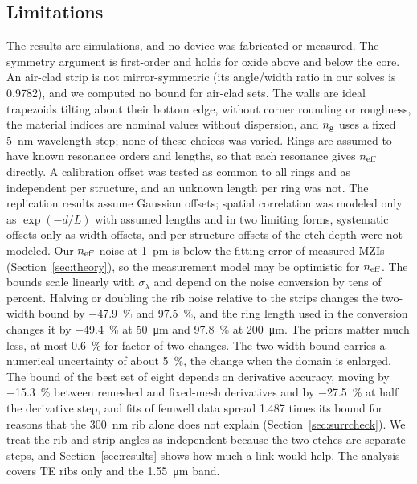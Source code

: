 \subsection{Limitations}

The results are simulations, and no device was fabricated or measured. The symmetry argument is first-order and holds
for oxide above and below the core. An air-clad strip is not mirror-symmetric (its angle/width ratio in our solves is
0.9782), and we computed no bound for air-clad sets. The walls are ideal trapezoids tilting about their bottom edge,
without corner rounding or roughness, the material indices are nominal values without dispersion, and $n_\mathrm{g}$ uses a fixed
\qty{5}{nm} wavelength step; none of these choices was varied. Rings are assumed to have known resonance orders and
lengths, so that each resonance gives $n_\mathrm{eff}$ directly. A calibration offset was tested as common to all rings and as independent per structure, and an unknown
length per ring was not. The replication results assume Gaussian offsets; spatial correlation was modeled only as $\exp(-d/L)$ with assumed lengths and in two limiting
forms, systematic offsets only as width offsets, and per-structure offsets of the etch depth were not modeled. Our $n_\mathrm{eff}$ noise at \qty{1}{pm} is below the fitting error of measured MZIs
(Section~\ref{sec:theory}), so the measurement model may be optimistic for $n_\mathrm{eff}$. The bounds scale linearly with
$\sigma_\lambda$ and depend on the noise conversion by tens of
percent. Halving or doubling the rib noise relative to the strips changes the two-width bound by
\qty{-47.9}{\percent} and \qty{97.5}{\percent}, and the ring length used in the conversion changes it by
\qty{-49.4}{\percent} at \qty{50}{\micro m} and \qty{97.8}{\percent} at \qty{200}{\micro m}. The priors matter much
less, at most \qty{0.6}{\percent} for factor-of-two changes. The two-width bound carries a numerical uncertainty of
about \qty{5}{\percent}, the change when the domain is enlarged. The bound of the best set of eight depends on derivative accuracy,
moving by \qty{-15.3}{\percent} between remeshed and fixed-mesh derivatives and by \qty{-27.5}{\percent} at half the
derivative step, and fits of femwell data spread 1.487 times its bound for reasons that the \qty{300}{nm} rib alone does not explain (Section~\ref{sec:surrcheck}). We treat the rib and strip angles as independent because the two etches are separate steps, and
Section~\ref{sec:results} shows how much a link would help. The analysis covers TE ribs only and the
\qty{1.55}{\micro m} band.

